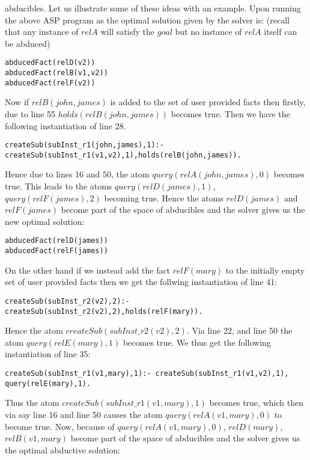 \documentclass{article}
\begin{document}
abducibles. Let us illustrate some of these ideas with an example. Upon running the above ASP program as the optimal solution given by the solver is: (recall that any instance of $relA$ will satisfy the $goal$ but no instance of $relA$ itself can be abduced)
\begin{verbatim}
abducedFact(relD(v2)) 
abducedFact(relB(v1,v2)) 
abducedFact(relF(v2))    
\end{verbatim}
Now if $relB(john,james)$ is added to the set of user provided facts then firstly, due to line 55 $holds(relB(john,james))$ becomes true. Then we have the following instantiation of line 28.
\begin{verbatim}
createSub(subInst_r1(john,james),1):-createSub(subInst_r1(v1,v2),1),holds(relB(john,james)). 
\end{verbatim}
Hence due to lines 16 and 50, the atom $query(relA(john,james),0)$ becomes true. This leads to the atoms $query(relD(james),1)$, $query(relF(james),2)$ becoming true. Hence the atoms $relD(james)$ and $relF(james)$ become part of the space of abducibles and the solver gives us the new optimal solution:
\begin{verbatim}
abducedFact(relD(james)) 
abducedFact(relF(james)) 
\end{verbatim}
On the other hand if we instead add the fact $relF(mary)$ to the initially empty set of user provided facts then we get the follwing instantiation of line 41:
\begin{verbatim}
createSub(subInst_r2(v2),2):-createSub(subInst_r2(v2),2),holds(relF(mary)).    
\end{verbatim}
Hence the atom $createSub(subInst\_r2(v2),2)$. Via line 22, and line 50 the atom $query(relE(mary),1)$ becomes true. We thus get the following instantiation of line 35:
\begin{verbatim}
createSub(subInst_r1(v1,mary),1):- createSub(subInst_r1(v1,v2),1), query(relE(mary),1).   
\end{verbatim}
Thus the atom $createSub(subInst\_r1(v1,mary),1)$ becomes true, which then via say line 16 and line 50 causes the atom $query(relA(v1,mary),0)$ to become true. Now, because of $query(relA(v1,mary),0)$, $relD(mary)$, $relB(v1,mary)$ become part of the space of abducibles and the solver gives us the optimal abductive solution: 
\end{document}
